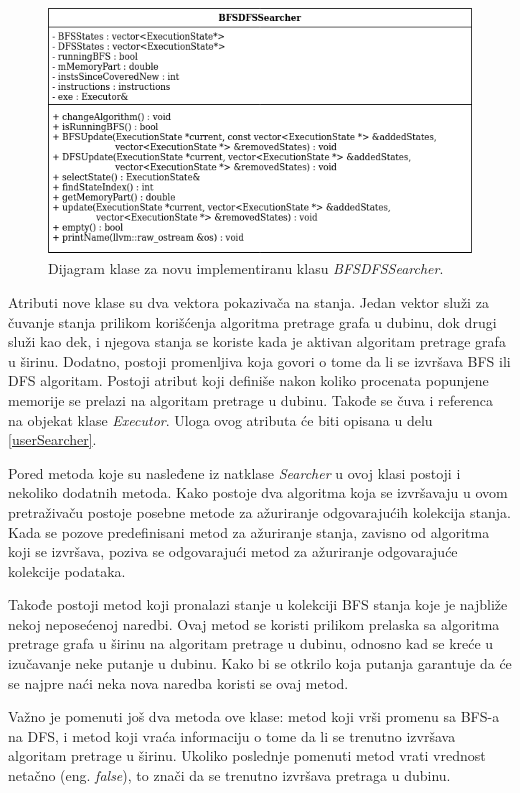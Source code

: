 \documentclass[12pt,oneside]{memoir}
\begin{document}
\begin{figure}[ht]
    \centering
    \includegraphics[width=\linewidth]{dijagram_klase.png}
    \caption{Dijagram klase za novu implementiranu klasu \textit{BFSDFSSearcher}.}
    \label{fig:UML}
\end{figure}

Atributi nove klase su dva vektora pokazivača na stanja. Jedan vektor služi za čuvanje stanja prilikom korišćenja algoritma pretrage grafa u dubinu, dok drugi služi kao dek, i njegova stanja se koriste kada je aktivan algoritam pretrage grafa u širinu. Dodatno, postoji promenljiva koja govori o tome da li se izvršava BFS ili DFS algoritam. Postoji atribut koji definiše nakon koliko procenata popunjene memorije se prelazi na algoritam pretrage u dubinu. Takođe se čuva i referenca na objekat klase \textit{Executor}. Uloga ovog atributa će biti opisana u delu \ref{userSearcher}.

Pored metoda koje su nasleđene iz natklase \textit{Searcher} u ovoj klasi postoji i nekoliko dodatnih metoda. Kako postoje dva algoritma koja se izvršavaju u ovom pretraživaču postoje posebne metode za ažuriranje odgovarajućih kolekcija stanja. Kada se pozove predefinisani metod za ažuriranje stanja, zavisno od algoritma koji se izvršava, poziva se odgovarajući metod za ažuriranje odgovarajuće kolekcije podataka. 

Takođe postoji metod koji pronalazi stanje u kolekciji BFS stanja koje je najbliže nekoj neposećenoj naredbi. Ovaj metod se koristi prilikom prelaska sa algoritma pretrage grafa u širinu na algoritam pretrage u dubinu, odnosno kad se kreće u izučavanje neke putanje u dubinu. Kako bi se otkrilo koja putanja garantuje da će se najpre naći neka nova naredba koristi se ovaj metod. 

Važno je pomenuti još dva metoda ove klase: metod koji vrši promenu sa BFS-a na DFS, i metod koji vraća informaciju o tome da li se trenutno izvršava algoritam pretrage u širinu. Ukoliko poslednje pomenuti metod vrati vrednost netačno (eng. \textit{false}), to znači da se trenutno izvršava pretraga u dubinu.
\end{document}
